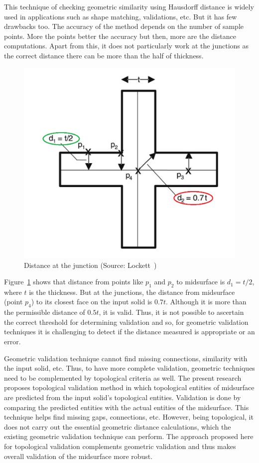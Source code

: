 
This technique of checking geometric similarity using Hausdorff distance is widely used in applications such as shape matching, validations, etc. But it has few drawbacks too. The accuracy of the method depends on the number of sample points. More the points better the accuracy but then, more are the distance computations. Apart from this, it does not particularly work at the junctions as the correct distance there can be more than the half of thickness. 


\begin{figure}[!h]
\centering     %
\includegraphics[width=0.45\linewidth,valign=t]{../Common/images/lockettx}
\caption{Distance at the junction (Source: Lockett~\cite{Lockett2008})}
\label{fig:litsurvey:lockettx}
\end{figure}


Figure~\ref{fig:litsurvey:lockettx} shows that distance from points like $p_1$ and $p_2$ to midsurface is $d_1 = t/2$, where $t$ is the thickness. But at the junctions, the distance from midsurface (point $p_4$) to its closest face on the input solid is $0.7t$. Although it is more than the permissible distance of $0.5t$, it is valid. Thus, it is not possible to ascertain the correct threshold for determining validation and so, for geometric validation techniques it is challenging to detect if the distance measured is appropriate or an error.


Geometric validation technique cannot find missing connections, similarity with the input solid, etc. Thus, to have more complete validation, geometric techniques need to be complemented by topological criteria as well. The present research proposes topological validation method in which topological entities of midsurface are predicted from the input solid's topological entities. Validation is done by comparing the predicted entities with the actual entities of the midsurface. This technique helps find missing gaps, connections, etc. However, being topological, it does not carry out the essential geometric distance calculations, which the existing  geometric validation technique can perform. The approach proposed here for topological validation complements geometric validation and thus makes overall validation of the midsurface more robust.

